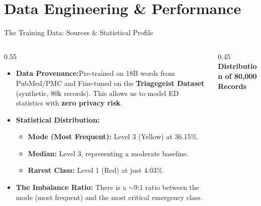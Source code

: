 \documentclass[10pt,aspectratio=169]{beamer}
\begin{document}
\section{Data Engineering \& Performance}

\begin{frame}{The Training Data: Sources \& Statistical Profile}
	\begin{columns}[T]
		\begin{column}{0.55\textwidth}
			\begin{itemize}
				\item \textbf{Data Provenance:}Pre-trained on 18B words from PubMed/PMC and Fine-tuned on the \textbf{Triagegeist Dataset} (synthetic, 80k records). This allows us to model ED statistics with \textbf{zero privacy risk}.
				\item \textbf{Statistical Distribution:}
				\begin{itemize}
					\item \textbf{Mode (Most Frequent):} Level 3 (Yellow) at 36.15\%.
					\item \textbf{Median:} Level 3, representing a moderate baseline.
					\item \textbf{Rarest Class:} Level 1 (Red) at just 4.03\%.
				\end{itemize}
				\item \textbf{The Imbalance Ratio:} There is a $\sim$9:1 ratio between the mode (most frequent) and the most critical emergency class.
			\end{itemize}
		\end{column}
		
		\begin{column}{0.45\textwidth}
			\vspace{0.2cm}
			\textbf{Distribution of 80,000 Records} \\
			\vspace{0.2cm}
		\end{column}
	\end{columns}
\end{frame}
\end{document}
